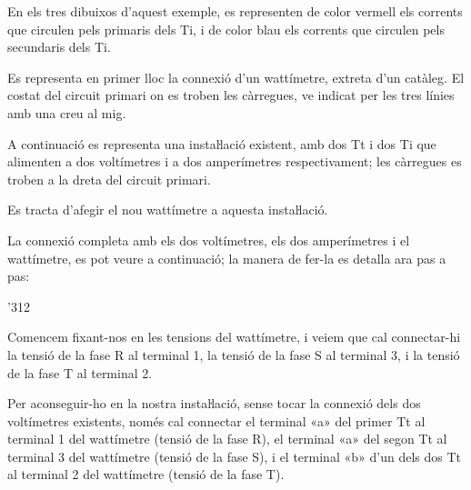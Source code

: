 \begin{exemple}
    En els tres dibuixos d'aquest exemple, es representen de color vermell els corrents que circulen pels primaris dels Ti, i de color blau els corrents que circulen pels secundaris dels Ti.

    Es representa en primer lloc la connexió d'un wattímetre, extreta
    d'un catàleg.   El costat del circuit primari on es troben les càrregues, ve indicat
    per les tres línies amb una creu al mig.

    \begin{center}
        
    \end{center}

    A continuació es representa una instaŀlació existent, amb dos Tt i
    dos Ti que alimenten a dos voltímetres i a dos amperímetres
    respectivament; les càrregues es troben a la dreta del circuit
    primari.

    \begin{center}
        
    \end{center}

    Es tracta d'afegir el nou wattímetre a aquesta
    instaŀlació.

    La connexió completa amb els dos voltímetres, els dos amperímetres i el wattímetre, es pot veure a continuació; la manera de fer-la es detalla ara pas a pas:

    \begin{dingautolist}{'312}

    \item Comencem fixant-nos en les tensions del wattímetre, i veiem que cal
    connectar-hi la tensió de la fase R al terminal 1, la tensió de la
    fase S al terminal 3, i la tensió de la fase T al terminal 2.

    Per aconseguir-ho en la nostra instaŀlació, sense tocar la
    connexió dels dos voltímetres existents, només cal connectar
    el terminal «\textsf{a}» del primer Tt al terminal 1 del wattímetre (tensió de
    la fase R), el terminal «\textsf{a}» del segon Tt al terminal 3 del wattímetre
    (tensió de la fase S), i el terminal «\textsf{b}» d'un dels dos Tt
    al terminal 2 del wattímetre (tensió de la fase T).


\end{dingautolist}
\end{exemple}
